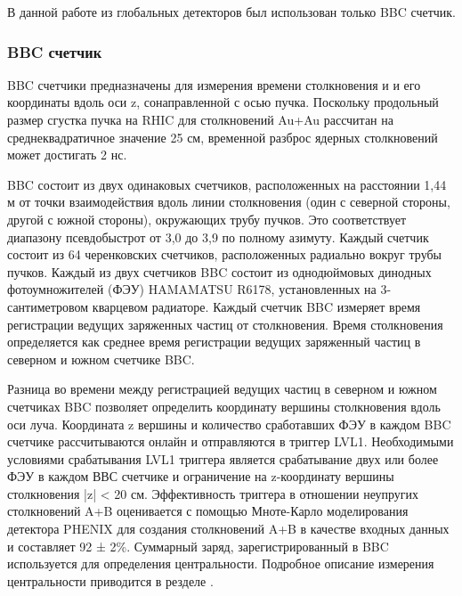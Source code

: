В данной работе из глобальных детекторов был использован только BBC счетчик.

\subsubsection{BBC счетчик}
BBC счетчики предназначены для измерения времени столкновения и и его координаты вдоль оси z, сонаправленной с осью пучка. Поскольку продольный размер сгустка пучка на RHIC для столкновений Au+Au рассчитан на среднеквадратичное значение 25 см, временной разброс ядерных столкновений может достигать 2 нс.

BBC состоит из двух одинаковых счетчиков, расположенных на расстоянии 1,44 м от точки взаимодействия вдоль линии столкновения (один с северной стороны, другой с южной стороны), окружающих трубу пучков. Это соответствует диапазону псевдобыстрот от 3,0 до 3,9 по полному азимуту. Каждый счетчик состоит из 64 черенковских счетчиков, расположенных радиально вокруг трубы пучков. Каждый из двух счетчиков BBC состоит из однодюймовых динодных фотоумножителей (ФЭУ) HAMAMATSU R6178, установленных на 3-сантиметровом кварцевом радиаторе. Каждый счетчик BBC измеряет время регистрации ведущих заряженных частиц от столкновения. Время столкновения определяется как среднее время регистрации ведущих заряженный частиц в северном и южном счетчике BBC. 

Разница во времени между регистрацией ведущих частиц в северном и южном счетчиках BBC позволяет определить координату вершины столкновения вдоль оси луча. Координата z вершины и количество сработавших ФЭУ в каждом BBC счетчике рассчитываются онлайн и отправляются в триггер LVL1. Необходимыми условиями срабатывания LVL1 триггера является срабатывание двух или более ФЭУ в каждом ВВС счетчике и ограничение на z-координату вершины столкновения |z| < 20 см.  Эффективность триггера в отношении неупругих столкновений A+B оценивается с помощью Мноте-Карло моделирования детектора PHENIX для создания столкновений A+B в качестве входных данных и составляет 92 ± 2\%. Суммарный заряд, зарегистрированный в BBC используется для определения центральности. Подробное описание измерения центральности приводится в резделе \label{sect3:centr}.

